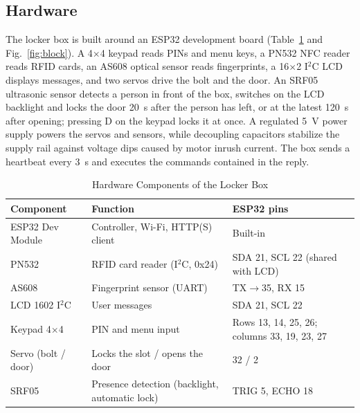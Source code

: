 \subsection{Hardware}

The locker box is built around an ESP32 development board (Table~\ref{tab:hw} and Fig.~\ref{fig:block}). A 4$\times$4
keypad reads PINs and menu keys, a PN532 NFC reader reads RFID cards, an AS608 optical sensor reads fingerprints, a
16$\times$2 I$^2$C LCD displays messages, and two servos drive the bolt and the door. An SRF05 ultrasonic sensor
detects a person in front of the box, switches on the LCD backlight and locks the door 20~s after the person has left,
or at the latest 120~s after opening; pressing D on the keypad locks it at once. A regulated 5~V power supply powers the
servos and sensors, while decoupling capacitors stabilize the supply rail against voltage dips caused by motor inrush
current. The box sends a heartbeat every 3~s and executes the commands contained in the reply.

\begin{table}[!htbp]\renewcommand{\arraystretch}{0.88}
\renewcommand{\arraystretch}{1.0}
\centering
\small
\caption{Hardware Components of the Locker Box}
\label{tab:hw}
\footnotesize
\begin{tabular}{l l l}
\hline
Component & Function & ESP32 pins \\
\hline
ESP32 Dev Module & Controller, Wi-Fi, HTTP(S) client & Built-in \\
PN532 & RFID card reader (I$^2$C, 0x24) & SDA 21, SCL 22 (shared with LCD) \\
AS608 & Fingerprint sensor (UART) & TX$\rightarrow$35, RX 15 \\
LCD 1602 I$^2$C & User messages & SDA 21, SCL 22 \\
Keypad 4$\times$4 & PIN and menu input & Rows 13, 14, 25, 26; columns 33, 19, 23, 27 \\
Servo (bolt / door) & Locks the slot / opens the door & 32 / 2 \\
SRF05 & Presence detection (backlight, automatic lock) & TRIG 5, ECHO 18 \\
\hline
\end{tabular}
\end{table}

